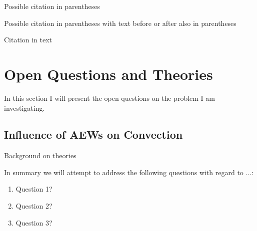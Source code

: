 Possible citation in parentheses \citep{kiladis2006three} 

Possible citation in parentheses with text before or after also in parentheses \citep[e.g. ][ Figure 1]{kiladis2006three} 

Citation in text \citet{tomassini2017interaction}

\section{Open Questions and Theories}
\label{sec:que}

In this section I will present the open questions on the problem I am investigating. 

\subsection{Influence of AEWs on Convection}
\label{sec:QTaew-conv}

Background on theories

In summary we will attempt to address the following questions with regard to ...:
\begin{enumerate}
\item Question 1?
\item Question 2?
\item Question 3?
\end{enumerate}
